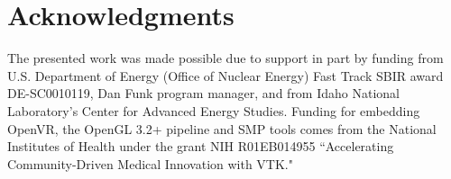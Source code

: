 \section*{Acknowledgments}

The presented work was made possible due to support in part by funding from U.S. Department of Energy (Office of Nuclear Energy) Fast Track SBIR award DE-SC0010119, Dan Funk program manager, and from Idaho National Laboratory's Center for Advanced Energy Studies. Funding for embedding OpenVR, the OpenGL 3.2+ pipeline and SMP tools comes from the National Institutes of Health under the grant NIH R01EB014955 ``Accelerating Community-Driven Medical Innovation with VTK."
